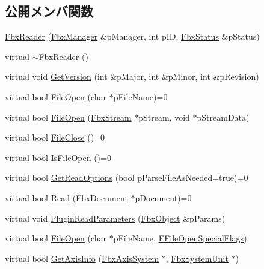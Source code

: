 \subsection*{公開メンバ関数}
\begin{DoxyCompactItemize}
\item 
\hyperlink{class_fbx_reader_a00f91923ea112d953f3317dbe80eb816}{Fbx\+Reader} (\hyperlink{class_fbx_manager}{Fbx\+Manager} \&p\+Manager, int p\+ID, \hyperlink{class_fbx_status}{Fbx\+Status} \&p\+Status)
\item 
virtual \hyperlink{class_fbx_reader_a2d63581951ac31fa4130badd8df96f1a}{$\sim$\+Fbx\+Reader} ()
\item 
virtual void \hyperlink{class_fbx_reader_aa16aacbaa1c1e16fc208624b55dd6767}{Get\+Version} (int \&p\+Major, int \&p\+Minor, int \&p\+Revision)
\item 
virtual bool \hyperlink{class_fbx_reader_a6105bd37ae86c03f35aee6f62901856d}{File\+Open} (char $\ast$p\+File\+Name)=0
\item 
virtual bool \hyperlink{class_fbx_reader_a819487a39b5e25f69a8dccf187ab4ab9}{File\+Open} (\hyperlink{class_fbx_stream}{Fbx\+Stream} $\ast$p\+Stream, void $\ast$p\+Stream\+Data)
\item 
virtual bool \hyperlink{class_fbx_reader_a327df94e5c24315fc5cbcedf0e7bb615}{File\+Close} ()=0
\item 
virtual bool \hyperlink{class_fbx_reader_af86b437702ffc840cfab52185cbc7232}{Is\+File\+Open} ()=0
\item 
virtual bool \hyperlink{class_fbx_reader_acea3c118db490378c9aed17512396932}{Get\+Read\+Options} (bool p\+Parse\+File\+As\+Needed=true)=0
\item 
virtual bool \hyperlink{class_fbx_reader_a29941746acc73d7ffd2411a9be9d2525}{Read} (\hyperlink{class_fbx_document}{Fbx\+Document} $\ast$p\+Document)=0
\item 
virtual void \hyperlink{class_fbx_reader_aa026634b699bea0df1b43850c08bb63a}{Plugin\+Read\+Parameters} (\hyperlink{class_fbx_object}{Fbx\+Object} \&p\+Params)
\item 
virtual bool \hyperlink{class_fbx_reader_a345b292805ea8799a9d962714e1ad9a5}{File\+Open} (char $\ast$p\+File\+Name, \hyperlink{class_fbx_reader_a1a14bd907bcda7dd48ba9b0a6236b7b8}{E\+File\+Open\+Special\+Flags})
\item 
virtual bool \hyperlink{class_fbx_reader_a73e58c3f7734250f0f8ffaef96b2df3f}{Get\+Axis\+Info} (\hyperlink{class_fbx_axis_system}{Fbx\+Axis\+System} $\ast$, \hyperlink{class_fbx_system_unit}{Fbx\+System\+Unit} $\ast$)

\end{DoxyCompactItemize}
